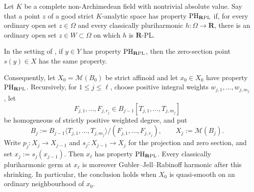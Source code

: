 \begin{corollary}
\label{cor:p061-iterated-relative-weighted-cone-closure}
Let \(K\) be a complete non-Archimedean field with nontrivial absolute
value.  Say that a point \(z\) of a good strict \(K\)-analytic space has
property \({\rm PH}_{\mathbf R{\rm PL}}\) if, for every ordinary open set
\(z\in\Omega\) and every classically pluriharmonic
\(h:\Omega\to\mathbf R\), there is an ordinary open set
\(z\in W\subset\Omega\) on which \(h\) is \(\mathbf R\)-PL.

In the setting of
, if \(y\in Y\)
has property \({\rm PH}_{\mathbf R{\rm PL}}\), then the zero-section point
\(s(y)\in X\) has the same property.

Consequently, let \(X_0=\mathcal M(B_0)\) be strict affinoid and let
\(x_0\in X_0\) have property \({\rm PH}_{\mathbf R{\rm PL}}\).  Recursively,
for \(1\leq j\leq \ell\), choose positive integral weights
\(w_{j,1},\ldots,w_{j,m_j}\), let
\[
 F_{j,1},\ldots,F_{j,r_j}
 \in B_{j-1}[T_{j,1},\ldots,T_{j,m_j}]
\]
be homogeneous of strictly positive weighted degree, and put
\[
 B_j:=B_{j-1}\langle T_{j,1},\ldots,T_{j,m_j}\rangle/
          (F_{j,1},\ldots,F_{j,r_j}),
 \qquad X_j:=\mathcal M(B_j).
\]
Write \(p_j:X_j\to X_{j-1}\) and \(s_j:X_{j-1}\to X_j\) for the projection
and zero section, and set \(x_j:=s_j(x_{j-1})\).  Then \(x_\ell\) has
property \({\rm PH}_{\mathbf R{\rm PL}}\).  Every classically
pluriharmonic germ at \(x_\ell\) is moreover Gubler--Jell--Rabinoff
harmonic after this shrinking.  In particular, the conclusion holds when
\(X_0\) is quasi-smooth on an ordinary neighbourhood of \(x_0\).
\end{corollary}
